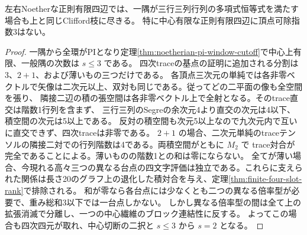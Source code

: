 \begin{corollary}\label{cor:no-index-three-finite-noetherian-window}
左右Noetherな正則有限四辺では、一隅が三行三列行列の多項式恒等式を満たす場合も上と同じClifford枝に尽きる。
特に中心有限な正則有限四辺に頂点可除指数3はない。
\end{corollary}
\begin{proof}
一隅から全環がPIとなり定理\ref{thm:noetherian-pi-window-cutoff}で中心上有限、一般隅の次数は $s\le3$ である。
四次traceの基点の証明に追加される分割は $3$、$2+1$、および薄いもの三つだけである。
各頂点三次元の単純では各非零ベクトルで矢像は二次元以上、双対も同じである。従ってどの二平面の像も全空間を張り、
隣接二辺の積の張空間は各非零ベクトル上で全射となる。そのtrace直交は階数1行列を含まず、
三行三列のSegreの余次元4より直交の次元は4以下、積空間の次元は5以上である。
反対の積空間も次元5以上なので九次元内で互いに直交できず、四次traceは非零である。
$2+1$ の場合、二次元単純のtraceテンソルの隣接二対での行列階数は4である。両積空間がともに $M_2$ で
trace対合が完全であることによる。薄いものの階数1との和は零にならない。
全てが薄い場合、今現れる高々三つの異なる台点の四文字評価は独立である。これらに支えられた関係は長さ20のグラフ上の退化した積対合を与え、定理\ref{thm:finite-four-slot-rank}で排除される。
和が零なら各台点には少なくとも二つの異なる倍率型が必要で、重み総和3以下では一台点しかない。
しかし異なる倍率型の間は全て上の拡張消滅で分離し、一つの中心繊維のブロック連結性に反する。
よってこの場合も四次四元が取れ、中心切断の二択と $s\le3$ から $s=2$ となる。
\end{proof}
